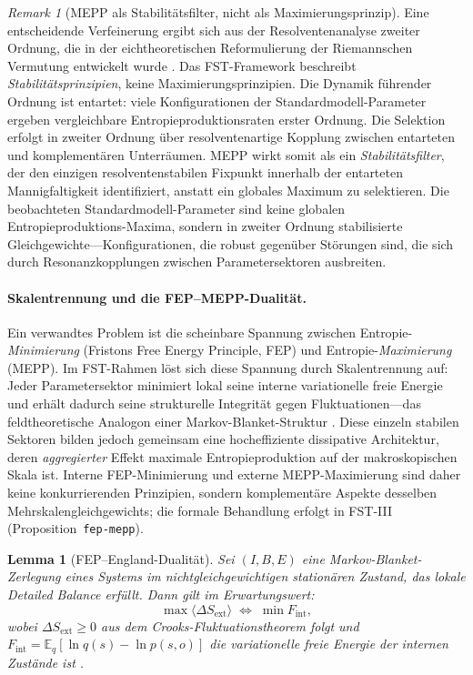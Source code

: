 \documentclass[12pt,a4paper]{article}
\newtheorem{lemma}{Lemma}
\theoremstyle{remark}
\newtheorem{remark}{Remark}
\begin{document}
\begin{remark}[MEPP als Stabilit\"atsfilter, nicht als Maximierungsprinzip]
\label{rem:mepp-stability-filter}
Eine entscheidende Verfeinerung ergibt sich aus der Resolventenanalyse zweiter Ordnung, die in der eichtheoretischen Reformulierung der Riemannschen Vermutung entwickelt wurde \citep{GeigerRH2026b}. Das FST-Framework beschreibt \emph{Stabilit\"atsprinzipien}, keine Maximierungsprinzipien. Die Dynamik f\"uhrender Ordnung ist entartet: viele Konfigurationen der Standardmodell-Parameter ergeben vergleichbare Entropieproduktionsraten erster Ordnung. Die Selektion erfolgt in zweiter Ordnung \"uber resolventenartige Kopplung zwischen entarteten und komplement\"aren Unterr\"aumen. MEPP wirkt somit als ein \emph{Stabilit\"atsfilter}, der den einzigen resolventenstabilen Fixpunkt innerhalb der entarteten Mannigfaltigkeit identifiziert, anstatt ein globales Maximum zu selektieren. Die beobachteten Standardmodell-Parameter sind keine globalen Entropieproduktions-Maxima, sondern in zweiter Ordnung stabilisierte Gleichgewichte---Konfigurationen, die robust gegen\"uber St\"orungen sind, die sich durch Resonanzkopplungen zwischen Parametersektoren ausbreiten.
\end{remark}

\paragraph{Skalentrennung und die FEP--MEPP-Dualit\"at.}
Ein verwandtes Problem ist die scheinbare Spannung zwischen Entropie-\emph{Minimierung} (Fristons Free Energy Principle, FEP) und Entropie-\emph{Maximierung} (MEPP). Im FST-Rahmen l\"ost sich diese Spannung durch Skalentrennung auf: Jeder Parametersektor minimiert lokal seine interne variationelle freie Energie und erh\"alt dadurch seine strukturelle Integrit\"at gegen Fluktuationen---das feldtheoretische Analogon einer Markov-Blanket-Struktur \citep{Friston2010}. Diese einzeln stabilen Sektoren bilden jedoch gemeinsam eine hocheffiziente dissipative Architektur, deren \emph{aggregierter} Effekt maximale Entropieproduktion auf der makroskopischen Skala ist. Interne FEP-Minimierung und externe MEPP-Maximierung sind daher keine konkurrierenden Prinzipien, sondern komplement\"are Aspekte desselben Mehrskalengleichgewichts; die formale Behandlung erfolgt in FST-III (Proposition~\texttt{fep-mepp}).

\begin{lemma}[FEP--England-Dualit\"at]\label{lem:fep-england}
Sei $(I, B, E)$ eine Markov-Blanket-Zerlegung eines Systems im nichtgleichgewichtigen station\"aren Zustand, das lokale Detailed Balance erf\"ullt. Dann gilt im Erwartungswert:
\[
  \max \langle \Delta S_{\mathrm{ext}} \rangle \;\Longleftrightarrow\; \min F_{\mathrm{int}},
\]
wobei $\Delta S_{\mathrm{ext}} \geq 0$ aus dem Crooks-Fluktuationstheorem folgt \citep{Crooks1999} und $F_{\mathrm{int}} = \mathbb{E}_q[\ln q(s) - \ln p(s,o)]$ die variationelle freie Energie der internen Zust\"ande ist \citep{FristonFreeEnergy}.
\end{lemma}
\end{document}
